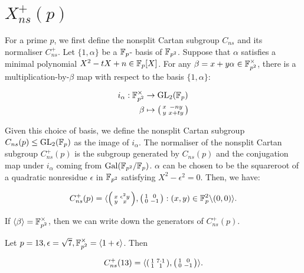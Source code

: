 \section{$X_{ns}^+(p)$}

For a prime $p$, we first define the nonsplit Cartan subgroup $C_{ns}$ and its normaliser $C_{ns}^+$. Let $\{ 1, \alpha \}$ be a $\mathbb{F}_p$- basis of $\mathbb{F}_{p^2}$. Suppose that $\alpha$ satisfies a minimal polynomial $X^2 - tX + n \in \mathbb{F}_p[X]$. For any $\beta = x + y\alpha \in \mathbb{F}_{p^2}^\times$, there is a multiplication-by-$\beta$ map with respect to the basis $\{ 1, \alpha \}$:

\begin{align*}
i_\alpha : \mathbb{F}_{p^2}^\times &\rightarrow \operatorname{GL}_2(\mathbb{F}_p) \\
\beta &\mapsto \begin{psmallmatrix} x & -ny \\ y & x + ty \end{psmallmatrix}
\end{align*}

Given this choice of basis, we define the nonsplit Cartan subgroup $C_{ns}(p) \leq \operatorname{GL}_2(\mathbb{F}_p)$ as the image of $i_\alpha$. The normaliser of the nonsplit Cartan subgroup $C_{ns}^+(p)$ is the subgroup generated by $C_{ns}(p)$ and the conjugation map under $i_\alpha$ coming from $\operatorname{Gal}(\mathbb{F}_{p^2}/\mathbb{F}_p)$. $\alpha$ can be chosen to be the squareroot of a quadratic nonresidue $\epsilon$ in $\mathbb{F}_{p^2}$ satisfying $X^2 - \epsilon^2 = 0$. Then, we have:

\[
 C_{ns}^+(p) = \langle \begin{psmallmatrix} x & \epsilon^2 y \\ y & x\end{psmallmatrix} , \begin{psmallmatrix} 1 & 0 \\ 0 & -1 \end{psmallmatrix} : (x,y) \in \mathbb{F}_p^2 \backslash (0,0) \rangle.
 \]
 
 If $\langle \beta \rangle= \mathbb{F}_{p^2}^\times$, then we can write down the generators of $C_{ns}^+(p)$.
 
 \begin{example}
 Let $p = 13, \epsilon = \sqrt{7}, \mathbb{F}_{p^2}^\times = \langle 1 + \epsilon \rangle$. Then 
 
 \[
 C_{ns}^+(13) = \langle \begin{psmallmatrix} 1 & 7 \cdot 1 \\ 1 & 1 \end{psmallmatrix}, \begin{psmallmatrix} 1 & 0 \\ 0 & -1 \end{psmallmatrix} \rangle.
 \]
 \end{example}
 
